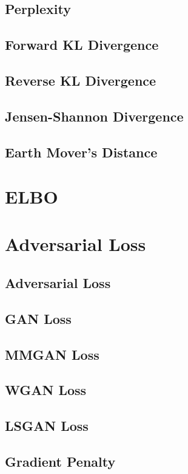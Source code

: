 \documentclass{article}
\begin{document}
\subsection{Perplexity}
\subsection{Forward KL Divergence}
\subsection{Reverse KL Divergence}
\subsection{Jensen-Shannon Divergence}
\subsection{Earth Mover's Distance}

\section{ELBO}


\section{Adversarial Loss}
\subsection{Adversarial Loss}
\subsection{GAN Loss}
\subsection{MMGAN Loss}
\subsection{WGAN Loss}
\subsection{LSGAN Loss}
\subsection{Gradient Penalty}
\end{document}
